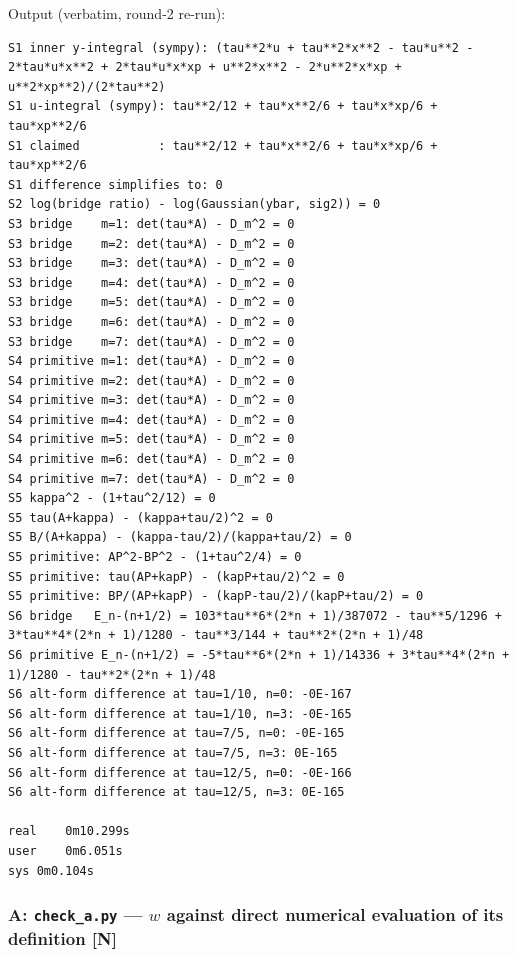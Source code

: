 \documentclass[11pt,a4paper]{article}
\begin{document}
Output (verbatim, round-2 re-run):

\begin{lstlisting}
S1 inner y-integral (sympy): (tau**2*u + tau**2*x**2 - tau*u**2 - 2*tau*u*x**2 + 2*tau*u*x*xp + u**2*x**2 - 2*u**2*x*xp + u**2*xp**2)/(2*tau**2)
S1 u-integral (sympy): tau**2/12 + tau*x**2/6 + tau*x*xp/6 + tau*xp**2/6
S1 claimed           : tau**2/12 + tau*x**2/6 + tau*x*xp/6 + tau*xp**2/6
S1 difference simplifies to: 0
S2 log(bridge ratio) - log(Gaussian(ybar, sig2)) = 0
S3 bridge    m=1: det(tau*A) - D_m^2 = 0
S3 bridge    m=2: det(tau*A) - D_m^2 = 0
S3 bridge    m=3: det(tau*A) - D_m^2 = 0
S3 bridge    m=4: det(tau*A) - D_m^2 = 0
S3 bridge    m=5: det(tau*A) - D_m^2 = 0
S3 bridge    m=6: det(tau*A) - D_m^2 = 0
S3 bridge    m=7: det(tau*A) - D_m^2 = 0
S4 primitive m=1: det(tau*A) - D_m^2 = 0
S4 primitive m=2: det(tau*A) - D_m^2 = 0
S4 primitive m=3: det(tau*A) - D_m^2 = 0
S4 primitive m=4: det(tau*A) - D_m^2 = 0
S4 primitive m=5: det(tau*A) - D_m^2 = 0
S4 primitive m=6: det(tau*A) - D_m^2 = 0
S4 primitive m=7: det(tau*A) - D_m^2 = 0
S5 kappa^2 - (1+tau^2/12) = 0
S5 tau(A+kappa) - (kappa+tau/2)^2 = 0
S5 B/(A+kappa) - (kappa-tau/2)/(kappa+tau/2) = 0
S5 primitive: AP^2-BP^2 - (1+tau^2/4) = 0
S5 primitive: tau(AP+kapP) - (kapP+tau/2)^2 = 0
S5 primitive: BP/(AP+kapP) - (kapP-tau/2)/(kapP+tau/2) = 0
S6 bridge   E_n-(n+1/2) = 103*tau**6*(2*n + 1)/387072 - tau**5/1296 + 3*tau**4*(2*n + 1)/1280 - tau**3/144 + tau**2*(2*n + 1)/48
S6 primitive E_n-(n+1/2) = -5*tau**6*(2*n + 1)/14336 + 3*tau**4*(2*n + 1)/1280 - tau**2*(2*n + 1)/48
S6 alt-form difference at tau=1/10, n=0: -0E-167
S6 alt-form difference at tau=1/10, n=3: -0E-165
S6 alt-form difference at tau=7/5, n=0: -0E-165
S6 alt-form difference at tau=7/5, n=3: 0E-165
S6 alt-form difference at tau=12/5, n=0: -0E-166
S6 alt-form difference at tau=12/5, n=3: 0E-165

real    0m10.299s
user    0m6.051s
sys 0m0.104s
\end{lstlisting}

\hypertarget{a-check_a.py-w-against-direct-numerical-evaluation-of-its-definition-n}{%
\subsubsection{\texorpdfstring{A: \texttt{check\_a.py} --- \(w\) against
direct numerical evaluation of its definition
{[}N{]}}{A: check\_a.py --- w against direct numerical evaluation of its definition {[}N{]}}}\label{a-check_a.py-w-against-direct-numerical-evaluation-of-its-definition-n}}
\end{document}
